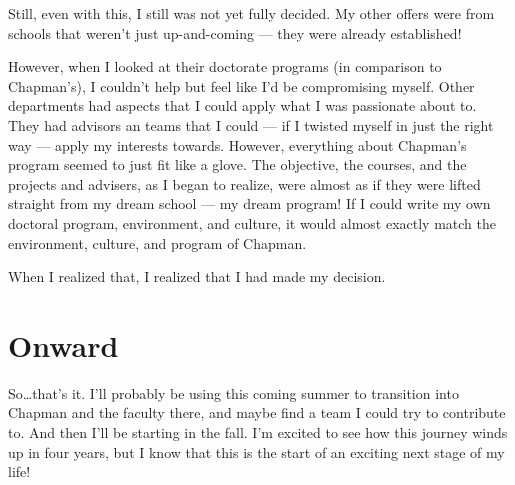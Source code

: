 \documentclass[]{article}
\begin{document}
Still, even with this, I still was not yet fully decided. My other offers were
from schools that weren't just up-and-coming --- they were already established!

However, when I looked at their doctorate programs (in comparison to Chapman's),
I couldn't help but feel like I'd be compromising myself. Other departments had
aspects that I could apply what I was passionate about to. They had advisors an
teams that I could --- if I twisted myself in just the right way --- apply my
interests towards. However, everything about Chapman's program seemed to just
fit like a glove. The objective, the courses, and the projects and advisers, as
I began to realize, were almost as if they were lifted straight from my dream
school --- my dream program! If I could write my own doctoral program,
environment, and culture, it would almost exactly match the environment,
culture, and program of Chapman.

When I realized that, I realized that I had made my decision.

\section{Onward}\label{onward}

So\ldots{}that's it. I'll probably be using this coming summer to transition
into Chapman and the faculty there, and maybe find a team I could try to
contribute to. And then I'll be starting in the fall. I'm excited to see how
this journey winds up in four years, but I know that this is the start of an
exciting next stage of my life!
\end{document}
